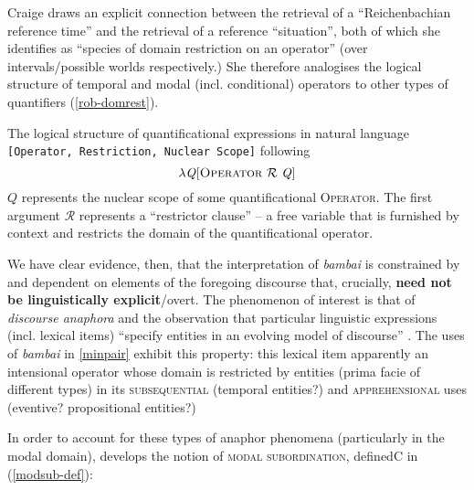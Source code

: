 {\centering{}}


\xe






 Craige \citet[663]{Roberts1995} draws an explicit connection between the retrieval of a ``Reichenbachian reference time'' and the retrieval of a reference ``situation'', both of which she identifies as ``species of domain restriction on an operator'' (over intervals/possible worlds respectively.) She therefore analogises the logical structure of temporal and modal (incl. conditional) operators to other types of quantifiers (\ref{rob-domrest}).
 
 \pex\label{rob-domrest} The logical structure of quantificational expressions in natural language\\ \texttt{[Operator,~Restriction, Nuclear Scope]} following \citet[665]{Roberts1995}
 	  $$ \lambda \mathit{Q}[\textsc{Operator}\ \mathcal R\ \mathit{Q}]$$
 	  $ \mathit{Q} $ represents the nuclear scope of some quantificational \textsc{Operator}. The first argument $ \mathcal R$ represents a ``restrictor clause'' -- a free variable that is furnished by context and restricts the domain of the quantificational operator.
\xe



We have clear evidence, then, that the interpretation of \textit{bambai} is constrained by and dependent on elements of the foregoing discourse that, crucially, \textbf{need not be linguistically explicit}/overt. The phenomenon of interest is that of \textit{discourse anaphora} and the observation that particular linguistic expressions (incl. lexical items) ``specify entities in an evolving model of discourse'' \citep[see][]{Webber1988}. The uses of \textit{bambai} in \ref{minpair} exhibit this property: this lexical item apparently an intensional operator whose domain is restricted by entities (prima facie of different types) in its \textsc{subsequential} (temporal entities?) and \textsc{apprehensional} uses (eventive? propositional entities?)


In order to account for these types of anaphor phenomena (particularly in the modal domain), \citet{Roberts1989,Roberts1990,Roberts2020} develops the notion of \textsc{modal subordination}, definedC in (\ref{modsub-def}):

